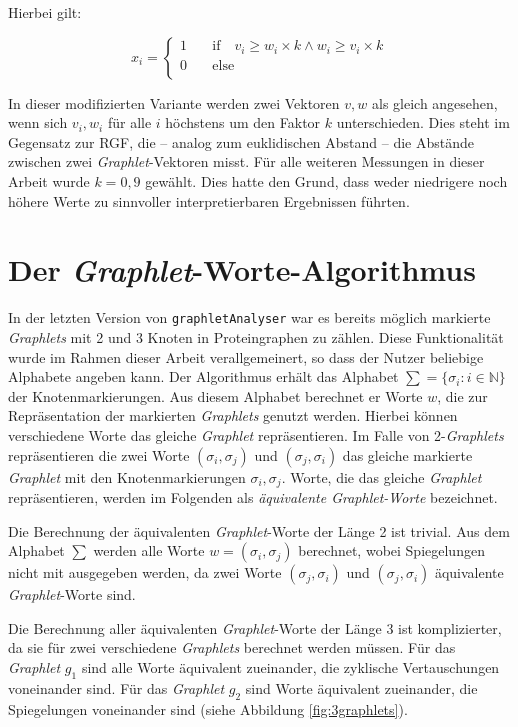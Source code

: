\documentclass{report}
\begin{document}
Hierbei gilt:

\[ x_i = 
   \begin{cases}
     1     & \quad \mathrm{if} \quad v_i \geq w_i \times k \land w_i \geq v_i \times k \\
     0     & \quad \mathrm{else} \\
   \end{cases}
\]

In dieser modifizierten Variante werden zwei Vektoren $v,w$ als gleich angesehen, wenn sich $v_i,w_i$ f\"ur alle $i$ h\"ochstens um den Faktor $k$ unterschieden.
Dies steht im Gegensatz zur RGF, die -- analog zum euklidischen Abstand -- die Abst\"ande zwischen zwei \textit{Graphlet}-Vektoren misst.
F\"ur alle weiteren Messungen in dieser Arbeit wurde $k=0,9$ gew\"ahlt. Dies hatte den Grund, dass weder niedrigere noch h\"ohere Werte zu sinnvoller interpretierbaren Ergebnissen f\"uhrten.

\section{Der \textit{Graphlet}-Worte-Algorithmus}

In der letzten Version von \texttt{graphletAnalyser} war es bereits m\"oglich markierte \textit{Graphlets} mit 2 und 3 Knoten in Proteingraphen zu z\"ahlen. Diese Funktionalit\"at wurde im Rahmen dieser Arbeit verallgemeinert, so dass der Nutzer beliebige Alphabete angeben kann.
Der Algorithmus erh\"alt das Alphabet $\sum = \{ \sigma_i : i \in \mathbb{N} \}$ der Knotenmarkierungen. Aus diesem Alphabet berechnet er Worte $w$, die zur Repr\"asentation der markierten \textit{Graphlets} genutzt werden.
Hierbei k\"onnen verschiedene Worte das gleiche \textit{Graphlet} repr\"asentieren. Im Falle von 2-\textit{Graphlets} repr\"asentieren die zwei Worte $(\sigma_i,\sigma_j)$ und $(\sigma_j, \sigma_i)$ das gleiche markierte \textit{Graphlet} mit den Knotenmarkierungen $\sigma_i,\sigma_j$. Worte, die das gleiche \textit{Graphlet} repr\"asentieren, werden im Folgenden als \emph{\"aquivalente Graphlet-Worte}  bezeichnet.


Die Berechnung der \"aquivalenten \textit{Graphlet}-Worte der L\"ange 2 ist trivial. Aus dem Alphabet $\sum$ werden alle Worte $w = (\sigma_i, \sigma_j)$ berechnet, wobei Spiegelungen nicht mit ausgegeben werden, da zwei Worte $ (\sigma_j, \sigma_i) $ und $ (\sigma_j, \sigma_i) $ \"aquivalente \textit{Graphlet}-Worte sind.

Die Berechnung aller \"aquivalenten \textit{Graphlet}-Worte der L\"ange 3 ist komplizierter, da sie f\"ur zwei verschiedene \textit{Graphlets} berechnet werden m\"ussen. F\"ur das \textit{Graphlet} $g_1$ sind alle Worte \"aquivalent zueinander, die zyklische Vertauschungen voneinander sind. F\"ur das \textit{Graphlet} $g_2$ sind Worte \"aquivalent zueinander, die Spiegelungen voneinander sind (siehe Abbildung \ref{fig:3graphlets}). \\
\end{document}
